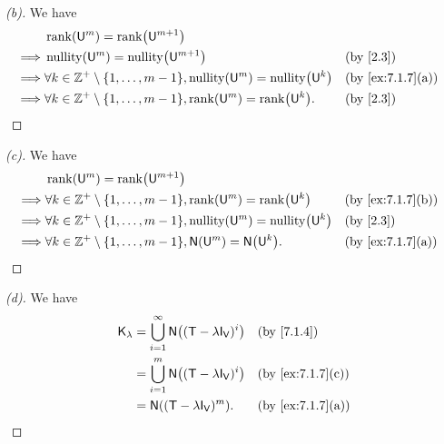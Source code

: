 \begin{proof}[(b)]
  We have
  \begin{align*}
             & \rk{\U^m} = \rk{\U^{m + 1}}                                                                      \\
    \implies & \nt{\U^m} = \nt{\U^{m + 1}}                                                &  & \by{2.3}         \\
    \implies & \forall k \in \Z^+ \setminus \set{1, \dots, m - 1}, \nt{\U^m} = \nt{\U^k}  &  & \by{ex:7.1.7}[a] \\
    \implies & \forall k \in \Z^+ \setminus \set{1, \dots, m - 1}, \rk{\U^m} = \rk{\U^k}. &  & \by{2.3}
  \end{align*}
\end{proof}

\begin{proof}[(c)]
  We have
  \begin{align*}
             & \rk{\U^m} = \rk{\U^{m + 1}}                                                                      \\
    \implies & \forall k \in \Z^+ \setminus \set{1, \dots, m - 1}, \rk{\U^m} = \rk{\U^k}  &  & \by{ex:7.1.7}[b] \\
    \implies & \forall k \in \Z^+ \setminus \set{1, \dots, m - 1}, \nt{\U^m} = \nt{\U^k}  &  & \by{2.3}         \\
    \implies & \forall k \in \Z^+ \setminus \set{1, \dots, m - 1}, \ns{\U^m} = \ns{\U^k}. &  & \by{ex:7.1.7}[a]
  \end{align*}
\end{proof}

\begin{proof}[(d)]
  We have
  \begin{align*}
    \vs{K}_{\lambda} & = \bigcup_{i = 1}^\infty \ns{(\T - \lambda \IT[\V])^i} &  & \by{7.1.4}       \\
                     & = \bigcup_{i = 1}^m \ns{(\T - \lambda \IT[\V])^i}      &  & \by{ex:7.1.7}[c] \\
                     & = \ns{(\T - \lambda \IT[\V])^m}.                       &  & \by{ex:7.1.7}[a]
  \end{align*}
\end{proof}

